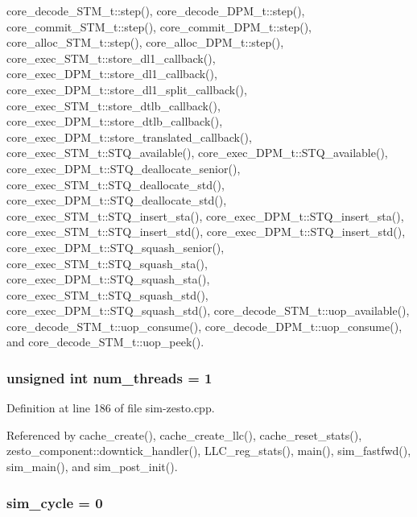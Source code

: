 core\_\-decode\_\-STM\_\-t::step(), core\_\-decode\_\-DPM\_\-t::step(), core\_\-commit\_\-STM\_\-t::step(), core\_\-commit\_\-DPM\_\-t::step(), core\_\-alloc\_\-STM\_\-t::step(), core\_\-alloc\_\-DPM\_\-t::step(), core\_\-exec\_\-STM\_\-t::store\_\-dl1\_\-callback(), core\_\-exec\_\-DPM\_\-t::store\_\-dl1\_\-callback(), core\_\-exec\_\-DPM\_\-t::store\_\-dl1\_\-split\_\-callback(), core\_\-exec\_\-STM\_\-t::store\_\-dtlb\_\-callback(), core\_\-exec\_\-DPM\_\-t::store\_\-dtlb\_\-callback(), core\_\-exec\_\-DPM\_\-t::store\_\-translated\_\-callback(), core\_\-exec\_\-STM\_\-t::STQ\_\-available(), core\_\-exec\_\-DPM\_\-t::STQ\_\-available(), core\_\-exec\_\-DPM\_\-t::STQ\_\-deallocate\_\-senior(), core\_\-exec\_\-STM\_\-t::STQ\_\-deallocate\_\-std(), core\_\-exec\_\-DPM\_\-t::STQ\_\-deallocate\_\-std(), core\_\-exec\_\-STM\_\-t::STQ\_\-insert\_\-sta(), core\_\-exec\_\-DPM\_\-t::STQ\_\-insert\_\-sta(), core\_\-exec\_\-STM\_\-t::STQ\_\-insert\_\-std(), core\_\-exec\_\-DPM\_\-t::STQ\_\-insert\_\-std(), core\_\-exec\_\-DPM\_\-t::STQ\_\-squash\_\-senior(), core\_\-exec\_\-STM\_\-t::STQ\_\-squash\_\-sta(), core\_\-exec\_\-DPM\_\-t::STQ\_\-squash\_\-sta(), core\_\-exec\_\-STM\_\-t::STQ\_\-squash\_\-std(), core\_\-exec\_\-DPM\_\-t::STQ\_\-squash\_\-std(), core\_\-decode\_\-STM\_\-t::uop\_\-available(), core\_\-decode\_\-STM\_\-t::uop\_\-consume(), core\_\-decode\_\-DPM\_\-t::uop\_\-consume(), and core\_\-decode\_\-STM\_\-t::uop\_\-peek().
\subsubsection[{num\_\-threads}]{\setlength{\rightskip}{0pt plus 5cm}unsigned int {\bf num\_\-threads} = 1}\label{sim-zesto_8cpp_26a8352e9cd3bc9a6a35bc8d88152985}




Definition at line 186 of file sim-zesto.cpp.

Referenced by cache\_\-create(), cache\_\-create\_\-llc(), cache\_\-reset\_\-stats(), zesto\_\-component::downtick\_\-handler(), LLC\_\-reg\_\-stats(), main(), sim\_\-fastfwd(), sim\_\-main(), and sim\_\-post\_\-init().
\subsubsection[{sim\_\-cycle}]{ {\bf sim\_\-cycle} = 0}\label{sim-zesto_8cpp_d93be82106e505ae03e3a443a62d7238}




